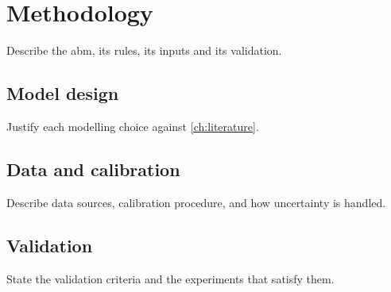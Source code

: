 \chapter{Methodology}
\label{ch:methodology}

Describe the \gls{abm}, its rules, its inputs and its validation.

\section{Model design}

Justify each modelling choice against \cref{ch:literature}.

\section{Data and calibration}

Describe data sources, calibration procedure, and how uncertainty is
handled.

\section{Validation}

State the validation criteria and the experiments that satisfy them.
